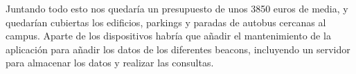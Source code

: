 Juntando todo esto nos quedaría un presupuesto de unos 3850 euros de media, y quedarían cubiertas los edificios, parkings y paradas de autobus cercanas al campus. Aparte de los dispositivos habría que añadir el mantenimiento de la aplicación para añadir los datos de los diferentes beacons, incluyendo un servidor para almacenar los datos y realizar las consultas. 

